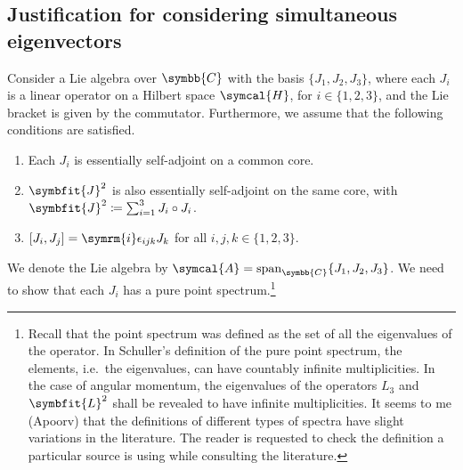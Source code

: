 \documentclass[12pt, a4 paper]{article}
\theoremstyle{definition}
\newcommand{\cc}{\symbb{C}}
\newcommand{\hilbert}{\symcal{H}}
\renewcommand{\i}{\symrm{i}}
\DeclareMathOperator{\spann}{span}
\begin{document}
    \subsection{Justification for considering simultaneous eigenvectors}

    Consider a Lie algebra over \(\cc\) with the basis \(\{J_1, J_2, J_3\}\), where each \(J_i\) is a linear operator on a Hilbert space \(\hilbert\), for \(i \in \{1, 2, 3\}\), and the Lie bracket is given by the commutator. Furthermore, we assume that the following conditions are satisfied.
    \begin{enumerate}
        \item Each \(J_i\) is essentially self-adjoint on a common core.
        \item \(\symbfit{J}^2\) is also essentially self-adjoint on the same core, with \(\symbfit{J}^2 \coloneq \sum_{i=1}^3 J_i \circ J_i\).
        \item \([J_i, J_j] = \i \epsilon_{ijk} J_k\) for all \(i, j, k \in \{1, 2, 3\}\).
    \end{enumerate}
    We denote the Lie algebra by \(\symcal{A} = \spann_{\cc}\{J_1, J_2, J_3\}\). We need to show that each \(J_i\) has a pure point spectrum.\footnote{Recall that the point spectrum was defined as the set of all the eigenvalues of the operator. In Schuller's definition of the pure point spectrum, the elements, i.e.\ the eigenvalues, can have countably infinite multiplicities. In the case of angular momentum, the eigenvalues of the operators \(L_3\) and \(\symbfit{L}^2\) shall be revealed to have infinite multiplicities. It seems to me (Apoorv) that the definitions of different types of spectra have slight variations in the literature. The reader is requested to check the definition a particular source is using while consulting the literature.}
\end{document}
